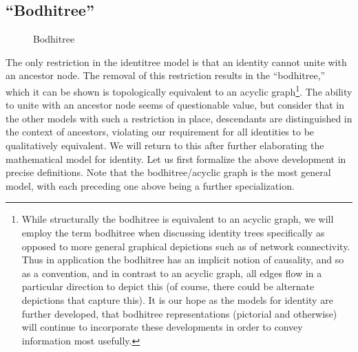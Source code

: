 \documentclass[pra,twocolumn,groupedaddress,10pt]{revtex4}
\theoremstyle{definition}
\begin{document}
\subsection{``Bodhitree''} \label{sec:bodhitree}

\begin{figure}[htp]
\centering
{}
\caption{\label{fig:bodhitree}Bodhitree}
\end{figure}

The only restriction in the identitree model is that an identity cannot unite with an ancestor node. The removal of this restriction results in the ``bodhitree,'' which it can be shown is topologically equivalent to an acyclic graph\footnote{While structurally the bodhitree is equivalent to an acyclic graph, we will employ the term bodhitree when discussing identity trees specifically as opposed to more general graphical depictions such as of network connectivity. Thus in application the bodhitree has an implicit notion of causality, and so as a convention, and in contrast to an acyclic graph, all edges flow in a particular direction to depict this (of course, there could be alternate depictions that capture this). It is our hope as the models for identity are further developed, that bodhitree representations (pictorial and otherwise) will continue to incorporate these developments in order to convey information most usefully.}. The ability to unite with an ancestor node seems of questionable value, but consider that in the other models with such a restriction in place, descendants are distinguished in the context of ancestors, violating our requirement for all identities to be qualitatively equivalent. We will return to this after further elaborating the mathematical model for identity. Let us first formalize the above development in precise definitions. Note that the bodhitree/acyclic graph is the most general model, with each preceding one above being a further specialization.
\end{document}
